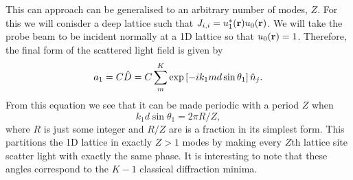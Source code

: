 This can approach can be generalised to an arbitrary number of modes,
$Z$. For this we will conisder a deep lattice such that
$J_{i,i} = u_1^* (\mathbf{r}) u_0 (\mathbf{r})$. We will take the probe beam to
be incident normally at a 1D lattice so that $u_0 (\mathbf{r}) =
1$. Therefore, the final form of the scattered light field is given by
\begin{equation}
  \label{eq:Dmodes}
  a_1 = C \hat{D} = C \sum_m^K \exp\left[-i k_1 m d \sin \theta_1
  \right] \hat{n}_j.
\end{equation}
From this equation we see that it can be made periodic with a period
$Z$ when
\begin{equation}
  k_1 d \sin \theta_1 = 2\pi R / Z,
\end{equation}
where $R$ is just some integer and $R/Z$ are is a fraction in its
simplest form. This partitions the 1D lattice in exactly $Z > 1$ modes
by making every $Z$th lattice site scatter light with exactly the same
phase. It is interesting to note that these angles correspond to the
$K-1$ classical diffraction minima.

